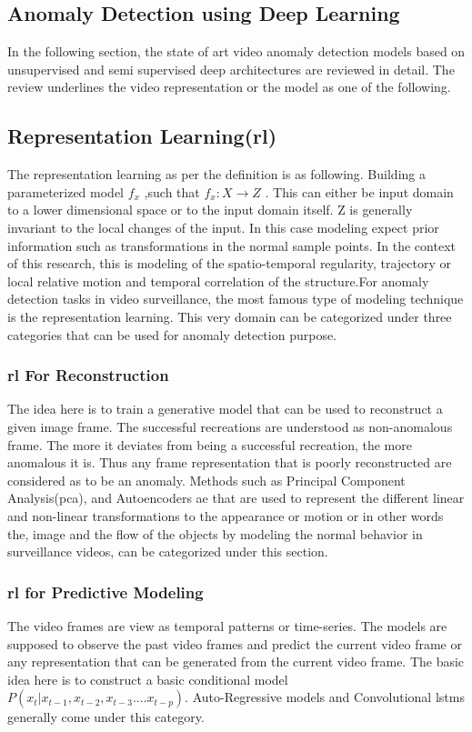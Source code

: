 \documentclass[a4paper,12pt]{report}
\begin{document}
\begin{itemize}
\section{Anomaly Detection using Deep Learning}
In the following section, the state of art video anomaly detection models based on unsupervised and semi supervised deep architectures are reviewed in detail. The review underlines the video representation or the model as one of the following.
\subsection{Representation Learning(\gls{rl}) }
The representation learning as per the definition is as following.  Building a parameterized model $f_x$ ,such that $f_x:X\to Z$ . This can either be input domain to a lower dimensional space or to the input domain itself. Z is generally invariant to the local changes of the input. In this case modeling expect prior information such as transformations in the normal sample points. In the context of this research, this is modeling of the spatio-temporal regularity, trajectory or local relative motion and temporal correlation of the structure.For anomaly detection tasks in video surveillance, the most famous type of modeling technique is the representation learning. This very domain can be categorized under three categories that can be used for anomaly detection purpose. 

\subsubsection{\gls{rl} For Reconstruction}
The idea here is to train a generative model that can be used to reconstruct a given image frame. The successful recreations are understood as non-anomalous frame. The more it deviates from being a successful recreation, the more anomalous it is. Thus any frame representation that is poorly reconstructed are considered as to be an anomaly. Methods such as Principal Component Analysis(\gls{pca}), and Autoencoders \gls{ae} that are used to represent the different linear and non-linear transformations to the appearance or motion or in other words the, image and the flow of the objects by modeling the normal behavior in surveillance videos, can be categorized under this section. 

\subsubsection{\gls{rl} for Predictive Modeling }
The video frames are view as temporal patterns or time-series. The models are supposed to observe the past video frames and predict the current video frame or any representation that can be generated from the current video frame. The basic idea here is to construct a basic conditional model $P(x_t|x_{t-1},x_{t-2},x_{t-3}....x_{t-p})$. Auto-Regressive models and Convolutional \gls{lstm}s generally come under this category. 


\end{itemize}
\end{document}
